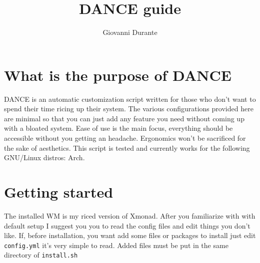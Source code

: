 \documentclass{article}
\date{}
\title{DANCE guide}
\author{Giovanni Durante}
\begin{document}
\maketitle
\section*{What is the purpose of DANCE}
DANCE is an automatic customization script written for those who don't want to spend their time ricing up their system. The various configurations provided here are minimal so that you can just add any feature you need without coming up with a bloated system. Ease of use is the main focus, everything should be accessible without you getting an headache. Ergonomics won't be sacrificed for the sake of aesthetics. This script is tested and currently works for the following GNU/Linux distros: Arch.

\section*{Getting started}
The installed WM is my riced version of Xmonad. After you familiarize with with default setup I suggest you you to read the config files and edit things you don't like. If, before installation, you want add some files or packages to install just edit \verb|config.yml| it's very simple to read. Added files must be put in the same directory of \verb|install.sh|
\end{document}
